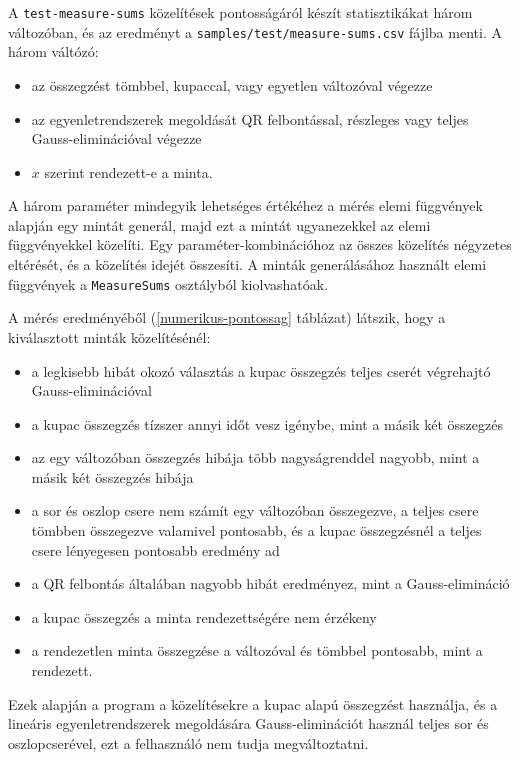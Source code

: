 A \texttt{test-measure-sums} közelítések pontosságáról készít statisztikákat három változóban, és az eredményt a \texttt{samples/test/measure-sums.csv} fájlba menti.
A három váltózó:
\begin{itemize}
\item az összegzést tömbbel, kupaccal, vagy egyetlen változóval végezze
\item az egyenletrendszerek megoldását QR felbontással, részleges vagy teljes Gauss-eliminációval végezze
\item $x$ szerint rendezett-e a minta.
\end{itemize}
A három paraméter mindegyik lehetséges értékéhez a mérés elemi függvények alapján egy mintát generál, majd ezt a mintát ugyanezekkel az elemi függvényekkel közelíti.
Egy paraméter-kombinációhoz az összes közelítés négyzetes eltérését, és a közelítés idejét összesíti.
A minták generálásához használt elemi függvények a \texttt{MeasureSums} osztályból kiolvashatóak.

A mérés eredményéből (\ref{numerikus-pontossag} táblázat) látszik, hogy a kiválasztott minták közelítésénél:
\begin{itemize}
\item a legkisebb hibát okozó választás a kupac összegzés teljes cserét végrehajtó Gauss-eliminációval
\item a kupac összegzés tízszer annyi időt vesz igénybe, mint a másik két összegzés
\item az egy változóban összegzés hibája több nagyságrenddel nagyobb, mint a másik két összegzés hibája
\item a sor és oszlop csere nem számít egy változóban összegezve, a teljes csere tömbben összegezve valamivel pontosabb, és a kupac összegzésnél a teljes csere lényegesen pontosabb eredmény ad
\item a QR felbontás általában nagyobb hibát eredményez, mint a Gauss-elimináció
\item a kupac összegzés a minta rendezettségére nem érzékeny
\item a rendezetlen minta összegzése a változóval és tömbbel pontosabb, mint a rendezett.
\end{itemize}
Ezek alapján a program a közelítésekre a kupac alapú összegzést használja, és a lineáris egyenletrendszerek megoldására Gauss-eliminációt használ teljes sor és oszlopcserével, ezt a felhasználó nem tudja megváltoztatni.

